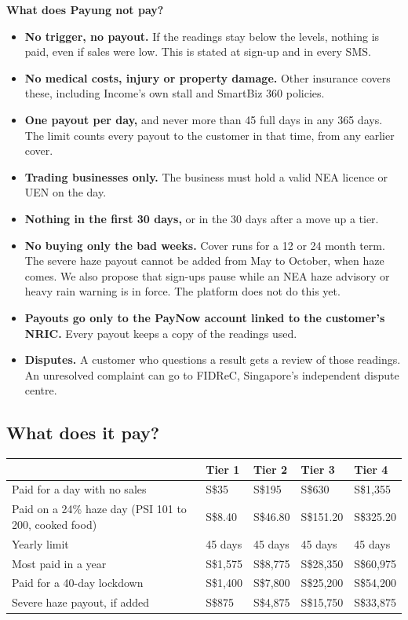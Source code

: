 \documentclass[11pt,a4paper]{article}
\newcommand{\head}{\rowcolor{soft}}
\newcommand{\sgd}{\textup{S\$}}
\begin{document}
\textbf{What does Payung not pay?}\label{sec:exclusions}
\begin{itemize}[leftmargin=1.2em]
  \item \textbf{No trigger, no payout.} If the readings stay below the levels, nothing is paid, even if sales were low. This is stated at sign-up and in every SMS.
  \item \textbf{No medical costs, injury or property damage.} Other insurance covers these, including Income's own stall and SmartBiz 360 policies.
  \item \textbf{One payout per day,} and never more than 45 full days in any 365 days. The limit counts every payout to the customer in that time, from any earlier cover.
  \item \textbf{Trading businesses only.} The business must hold a valid NEA licence or UEN on the day.
  \item \textbf{Nothing in the first 30 days,} or in the 30 days after a move up a tier.
  \item \textbf{No buying only the bad weeks.} Cover runs for a 12 or 24 month term. The severe haze payout cannot be added from May to October, when haze comes. We also propose that sign-ups pause while an NEA haze advisory or heavy rain warning is in force. The platform does not do this yet.
  \item \textbf{Payouts go only to the PayNow account linked to the customer's NRIC.} Every payout keeps a copy of the readings used.
  \item \textbf{Disputes.} A customer who questions a result gets a review of those readings. An unresolved complaint can go to FIDReC, Singapore's independent dispute centre.
\end{itemize}

\subsection{What does it pay?}\label{sec:pays}

{\small
\begin{center}
\begin{tabularx}{\textwidth}{|L{5.0cm}|Z|Z|Z|Z|}
\hline
\head & \textbf{Tier 1} & \textbf{Tier 2} & \textbf{Tier 3} & \textbf{Tier 4} \\
\hline
Paid for a day with no sales & \sgd 35 & \sgd 195 & \sgd 630 & \sgd 1,355 \\
\hline
Paid on a 24\% haze day (PSI 101 to 200, cooked food) & \sgd 8.40 & \sgd 46.80 & \sgd 151.20 & \sgd 325.20 \\
\hline
Yearly limit & 45 days & 45 days & 45 days & 45 days \\
\hline
Most paid in a year & \sgd 1,575 & \sgd 8,775 & \sgd 28,350 & \sgd 60,975 \\
\hline
Paid for a 40-day lockdown & \sgd 1,400 & \sgd 7,800 & \sgd 25,200 & \sgd 54,200 \\
\hline
Severe haze payout, if added & \sgd 875 & \sgd 4,875 & \sgd 15,750 & \sgd 33,875 \\
\hline
\end{tabularx}
\end{center}}
\end{document}

